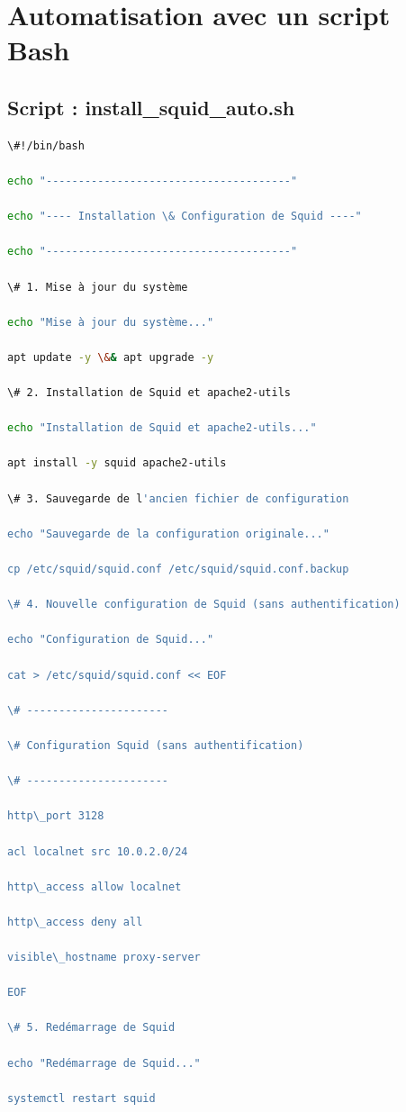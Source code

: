 \documentclass[12pt,a4paper]{article}
\begin{document}
\section{Automatisation avec un script Bash}
\subsection{Script : install_squid_auto.sh}
\begin{lstlisting}[language=bash]
\#!/bin/bash

echo "--------------------------------------"

echo "---- Installation \& Configuration de Squid ----"

echo "--------------------------------------"

\# 1. Mise à jour du système

echo "Mise à jour du système..."

apt update -y \&& apt upgrade -y

\# 2. Installation de Squid et apache2-utils

echo "Installation de Squid et apache2-utils..."

apt install -y squid apache2-utils

\# 3. Sauvegarde de l'ancien fichier de configuration

echo "Sauvegarde de la configuration originale..."

cp /etc/squid/squid.conf /etc/squid/squid.conf.backup

\# 4. Nouvelle configuration de Squid (sans authentification)

echo "Configuration de Squid..."

cat > /etc/squid/squid.conf << EOF

\# ----------------------

\# Configuration Squid (sans authentification)

\# ----------------------

http\_port 3128

acl localnet src 10.0.2.0/24

http\_access allow localnet

http\_access deny all

visible\_hostname proxy-server

EOF

\# 5. Redémarrage de Squid

echo "Redémarrage de Squid..."

systemctl restart squid


\end{lstlisting}
\end{document}
